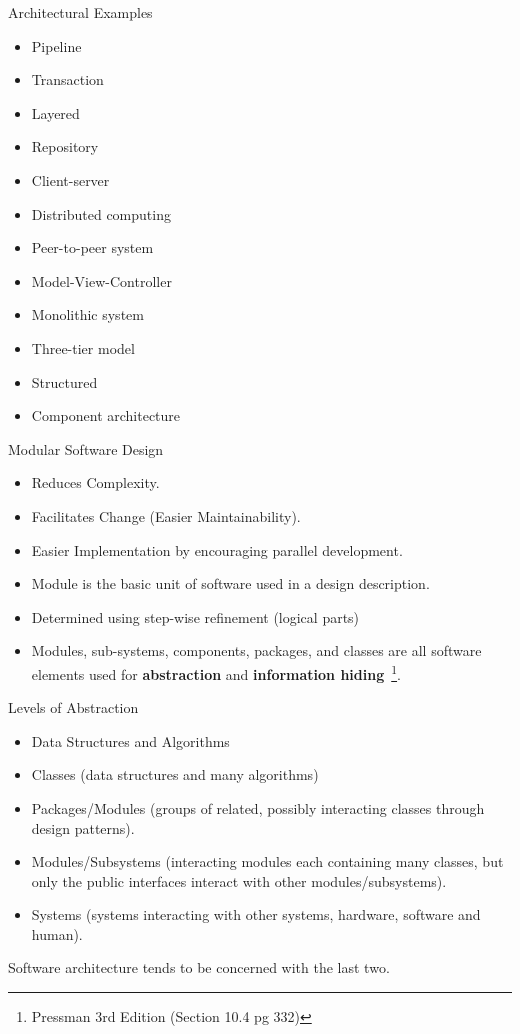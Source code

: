 \documentclass[aspectratio=1610,xcolor=dvipsnames,t,compress]{beamer}
\begin{document}
\begin{frame}{Architectural Examples} 
    \begin{itemize} 
        \item Pipeline
        \item Transaction
        \item Layered
        \item Repository
        \item Client-server 
        \item Distributed computing 
        \item Peer-to-peer system 
        \item Model-View-Controller
        \item Monolithic system 
        \item Three-tier model 
        \item Structured 
        \item Component architecture
    \end{itemize}
\end{frame} 

\begin{frame}{Modular Software Design} 
    \begin{itemize} 
        \item Reduces Complexity.
        \item Facilitates Change (Easier Maintainability).
        \item Easier Implementation by encouraging parallel development.
        \item Module is the basic unit of software used in a design description.
        \item Determined using step-wise refinement (logical parts)
        \item Modules, sub-systems, components, packages, and classes are all
            software elements used for \textbf{abstraction} and \textbf{information
            hiding}~\footnote{Pressman 3rd Edition (Section 10.4 pg 332)}.
    \end{itemize} 
\end{frame} 

\begin{frame}{Levels of Abstraction} 
    \begin{itemize}
        \item Data Structures and Algorithms
        \item Classes (data structures and many algorithms)
        \item Packages/Modules (groups of related, possibly interacting classes 
              through design patterns).
        \item Modules/Subsystems (interacting modules each containing many 
              classes, but only the public interfaces interact with other modules/subsystems).
        \item Systems (systems interacting with other systems, hardware, software and human).
    \end{itemize}
    Software architecture tends to be concerned with the last two.
\end{frame} 
\end{document}
